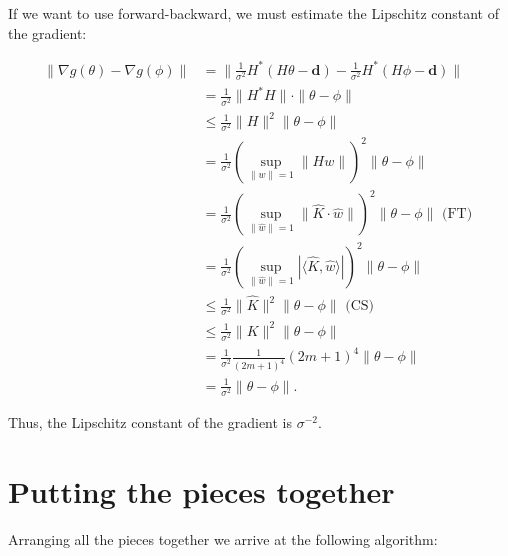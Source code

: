 \documentclass[paper=a4, fontsize=11pt]{scrartcl} %
\numberwithin{equation}{section} %
\numberwithin{figure}{section} %
\numberwithin{table}{section} %
\newcommand{\data}{\mathbf{d}}
\newcommand{\param}{\theta}
\newcommand{\paramm}{\phi}
\newcommand{\grad}{\nabla_{d} }
\begin{document}
If we want to use forward-backward, we must estimate the Lipschitz
constant of the gradient:

\begin{align*}
  \|\nabla g(\param) - \nabla g(\paramm)\| &= \|\frac{1}{\sigma^2}
  H^{*}(H\param - \data ) - \frac{1}{\sigma^2}H^{*}(H\paramm -
  \data)\| \\
  &=\frac{1}{\sigma^2}\|H^{*}H\| \cdot \|\param-\paramm\|\\
  &\leq \frac{1}{\sigma^2}\|H\|^2 \|\param-\paramm\| \\
  &= \frac{1}{\sigma^2} \left ( \sup_{\|w\| = 1} \|Hw\| \right )^2 \|\param-\paramm\| \\
  &= \frac{1}{\sigma^2} \left ( \sup_{\|\hat{w}\| = 1} \|\hat{K} \cdot \hat{w}\| \right )^2 \|\param-\paramm\| \text{ (FT) }\\
  &= \frac{1}{\sigma^2} \left ( \sup_{\|\hat{w}\| = 1} |\langle \hat{K},  \hat{w}\rangle| \right )^2 \|\param-\paramm\| \\
  &\leq \frac{1}{\sigma^2} \|\hat{K}\|^2 \|\param-\paramm\| \text{ (CS) }\\
  &\leq \frac{1}{\sigma^2} \|K\|^2 \|\param-\paramm\|\\
  &=\frac{1}{\sigma^2} \frac{1}{(2m+1)^4} (2m+1)^4 \|\param-\paramm\| \\
  &= \frac{1}{\sigma^2} \|\param-\paramm\|.
\end{align*}

Thus, the Lipschitz constant of the gradient is $\sigma^{-2}$.

\section{Putting the pieces together}

Arranging all the pieces together we arrive at the following algorithm:
\end{document}
